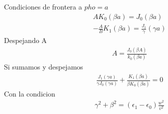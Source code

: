 Condiciones de frontera a $pho=a$
\begin{eqnarray}
AK_{0}(\beta a) = J_{0}(\beta a)\\
-\frac{A}{B}K_{1}(\beta a) = \frac{J_{1}}{\gamma}(\gamma a)
\end{eqnarray}
Despejando A
\begin{eqnarray}
 A= \frac{J_{0}(\beta A)}{k_{0}(\beta a)}
\end{eqnarray}
Si sumamos y despejamos
\begin{eqnarray}
	\frac{J_{1}(\gamma a)}{\gamma J_{0}(\gamma a)}+\frac{K_{1}(\beta a)}{\beta K_{0}(\beta a)} = 0
	\end{eqnarray}
Con la condicion
\begin{eqnarray}
	\gamma^2+\beta^2=(\epsilon_{1}-\epsilon_{0})\frac{w^2}{v^2}
\end{eqnarray}
